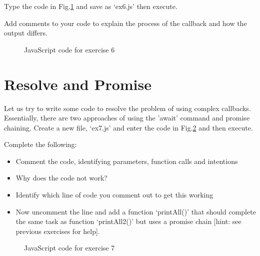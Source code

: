 Type the code in Fig.\ref{fi:ex56} and save as `ex6.js' then execute.

Add comments to your code to explain the process of the callback and how the output differs.

\begin{figure}[t!]
	\centering

	\caption{JavaScript code for exercise 6}
	\label{fi:ex56}
\end{figure}



\newpage
\section{Resolve and Promise}
Let us try to write some code to resolve the problem of using complex callbacks. Essentially, there are two approaches of using the 'await' command and promise chaining. Create a new file, `ex7.js' and enter the code in Fig.\ref{fi:ex57} and then execute. 

Complete the following:
\begin{itemize}
	\item Comment the code, identifying parameters, function calls and intentions
	\item Why does the code not work?
	\item Identify which line of code you comment out to get this working
	\item Now uncomment the line and add a function `printAll()' that should complete the same task as function `printAll2()' but uses a promise chain [hint: see previous exercises for help].
\end{itemize}

\begin{figure}[t!]
	\centering

	\caption{JavaScript code for exercise 7}
	\label{fi:ex57}
\end{figure}


\newpage
